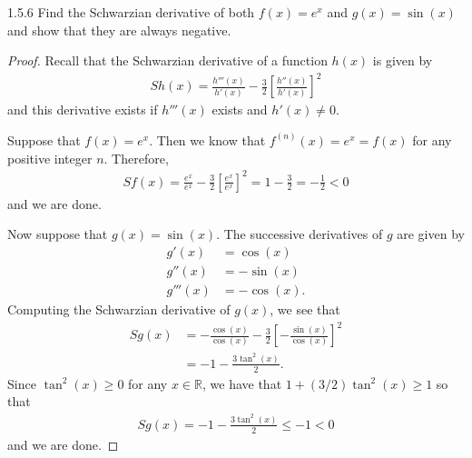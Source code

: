 \begin{problem}{1.5.6}
  Find the Schwarzian derivative of both $f(x) = e^x$ and $g(x) = \sin(x)$ and
  show that they are always negative.
\end{problem}

\begin{proof}
  Recall that the Schwarzian derivative of a function $h(x)$ is given by
  \begin{align*}
    Sh(x) = \frac{h'''(x)}{h'(x)} - \frac{3}{2}\left[\frac{h''(x)}{h'(x)}\right]^2
  \end{align*}
  and this derivative exists if $h'''(x)$ exists and $h'(x) \neq 0$.

  Suppose that $f(x) = e^x$. Then we know that $f^{(n)}(x) = e^x = f(x)$
  for any positive integer $n$. Therefore,
  \begin{align*}
    Sf(x) = \frac{e^x}{e^x} - \frac{3}{2}\left[\frac{e^x}{e^x}\right]^2 = 1 - \frac{3}{2} = -\frac{1}{2} < 0
  \end{align*}
  and we are done.

  Now suppose that $g(x) = \sin(x)$. The successive derivatives of $g$ are given by
  \begin{align*}
    g'(x) &= \cos(x)\\
    g''(x) &= -\sin(x)\\
    g'''(x) &= -\cos(x).
  \end{align*}
  Computing the Schwarzian derivative of $g(x)$, we see that
  \begin{align*}
    Sg(x)
    &= -\frac{\cos(x)}{\cos(x)} - \frac{3}{2}\left[-\frac{\sin(x)}{\cos(x)}\right]^2 \\
    &= -1 - \frac{3\tan^2(x)}{2}.
  \end{align*}
  Since $\tan^2(x) \geq 0$ for any $x\in\mathbb{R}$, we have that $1 + (3/2)\tan^2(x) \geq 1$ so that
  \begin{align*}
    Sg(x) = -1 - \frac{3\tan^2(x)}{2} \leq -1 < 0
  \end{align*}
  and we are done.
\end{proof}
\newpage
